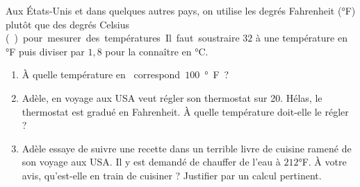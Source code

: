 

\begin{exercice}\label{exo2smath-0174}

Aux États-Unis et dans quelques autres pays, on utilise les degrés Fahrenheit (°F) plutôt que des degrés Celsius (\si\degreecelsius) pour mesurer des températures. Il faut soustraire $32$ à une température en °F puis diviser par $1,8$ pour la connaître en °C.  

\begin{enumerate}
    \item
        À quelle température en \si\degreecelsius correspond \( 100 \) °F ?
    \item
        Adèle, en voyage aux USA veut régler son thermostat sur \SI{20}{\degreecelsius}. Hélas, le thermostat est gradué en Fahrenheit. À quelle température doit-elle le régler ?
    \item
        Adèle essaye de suivre une recette dans un terrible livre de cuisine ramené de son voyage aux USA. Il y est demandé de chauffer de l'eau à \( 212\)°F. À votre avis, qu'est-elle en train de cuisiner ? Justifier par un calcul pertinent.
\end{enumerate}


\end{exercice}
